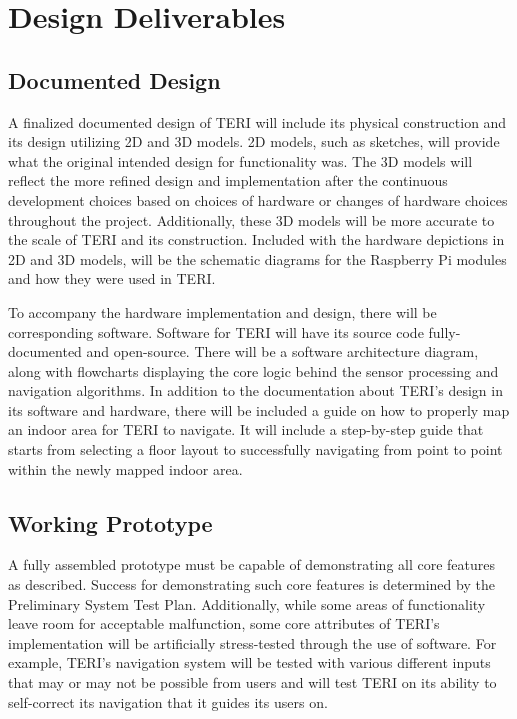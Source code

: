 \documentclass{article}
\begin{document}
\section{Design Deliverables}

\subsection{Documented Design}
A finalized documented design of TERI will include its physical construction and its design utilizing 2D and 3D models. 2D models, such as sketches, will provide what the original intended design for functionality was. The 3D models will reflect the more refined design and implementation after the continuous development choices based on choices of hardware or changes of hardware choices throughout the project. Additionally, these 3D models will be more accurate to the scale of TERI and its construction. Included with the hardware depictions in 2D and 3D models, will be the schematic diagrams for the Raspberry Pi modules and how they were used in TERI.

To accompany the hardware implementation and design, there will be corresponding software. Software for TERI will have its source code fully-documented and open-source. There will be a software architecture diagram, along with flowcharts displaying the core logic behind the sensor processing and navigation algorithms. In addition to the documentation about TERI's design in its software and hardware, there will be included a guide on how to properly map an indoor area for TERI to navigate. It will include a step-by-step guide that starts from selecting a floor layout to successfully navigating from point to point within the newly mapped indoor area.

\subsection{Working Prototype}
A fully assembled prototype must be capable of demonstrating all core features as described. Success for demonstrating such core features is determined by the Preliminary System Test Plan. Additionally, while some areas of functionality leave room for acceptable malfunction, some core attributes of TERI's implementation will be artificially stress-tested through the use of software. For example, TERI's navigation system will be tested with various different inputs that may or may not be possible from users and will test TERI on its ability to self-correct its navigation that it guides its users on.
\end{document}
